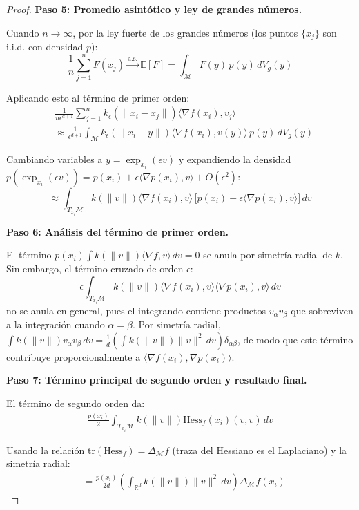 \begin{proof}
	\textbf{Paso 5: Promedio asintótico y ley de grandes números.}

	Cuando $n \to \infty$, por la ley fuerte de los grandes números (los puntos $\{x_j\}$ son i.i.d. con densidad $p$):
	\[
		\frac{1}{n} \sum_{j=1}^n F(x_j) \xrightarrow{\text{a.s.}} \mathbb{E}[F] = \int_{\mathcal{M}} F(y) \, p(y) \, dV_g(y)
	\]

	Aplicando esto al término de primer orden:
	\begin{align}
		&\frac{1}{n\epsilon^{d+1}} \sum_{j=1}^n k_\epsilon(\|x_i - x_j\|) \langle \nabla f(x_i), v_j \rangle\\
		&\approx \frac{1}{\epsilon^{d+1}} \int_{\mathcal{M}} k_\epsilon(\|x_i - y\|) \langle \nabla f(x_i), v(y) \rangle \, p(y) \, dV_g(y)
	\end{align}

	Cambiando variables a $y = \exp_{x_i}(\epsilon v)$ y expandiendo la densidad $p(\exp_{x_i}(\epsilon v)) = p(x_i) + \epsilon \langle \nabla p(x_i), v \rangle + O(\epsilon^2)$:
	\[
		\approx \int_{T_{x_i}\mathcal{M}} k(\|v\|) \langle \nabla f(x_i), v \rangle \, \bigl[p(x_i) + \epsilon \langle \nabla p(x_i), v \rangle\bigr] \, dv
	\]

	\textbf{Paso 6: Análisis del término de primer orden.}

	El término $p(x_i) \int k(\|v\|) \langle \nabla f, v \rangle \, dv = 0$ se anula por simetría radial de $k$. Sin embargo, el término cruzado de orden $\epsilon$:
	\[
		\epsilon \int_{T_{x_i}\mathcal{M}} k(\|v\|) \langle \nabla f(x_i), v \rangle \langle \nabla p(x_i), v \rangle \, dv
	\]
	no se anula en general, pues el integrando contiene productos $v_\alpha v_\beta$ que sobreviven a la integración cuando $\alpha = \beta$. Por simetría radial, $\int k(\|v\|) v_\alpha v_\beta \, dv = \frac{1}{d}\left(\int k(\|v\|) \|v\|^2 \, dv\right) \delta_{\alpha\beta}$, de modo que este término contribuye proporcionalmente a $\langle \nabla f(x_i), \nabla p(x_i) \rangle$.

	\textbf{Paso 7: Término principal de segundo orden y resultado final.}

	El término de segundo orden da:
	\begin{align}
		\frac{p(x_i)}{2} \int_{T_{x_i}\mathcal{M}} k(\|v\|) \text{Hess}_f(x_i)(v,v) \, dv
	\end{align}

	Usando la relación $\text{tr}(\text{Hess}_f) = \Delta_\mathcal{M} f$ (traza del Hessiano es el Laplaciano) y la simetría radial:
	\begin{align}
		&= \frac{p(x_i)}{2d} \left(\int_{\mathbb{R}^d} k(\|v\|) \|v\|^2 \, dv\right) \Delta_\mathcal{M} f(x_i)
	\end{align}


\end{proof}
